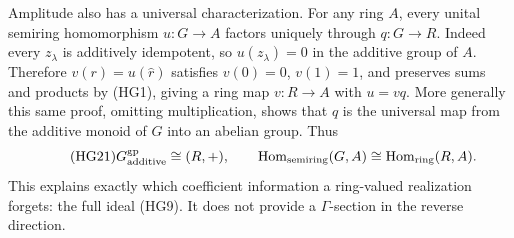 Amplitude also has a universal characterization.  For any ring
$A$, every unital semiring homomorphism $u:G\to A$ factors
uniquely through $q:G\to R$.  Indeed every $z_\lambda$ is
additively idempotent, so $u(z_\lambda)=0$ in the additive
group of $A$.  Therefore $v(r)=u(\widehat r)$ satisfies
$v(0)=0$, $v(1)=1$, and preserves sums and products by (HG1),
giving a ring map $v:R\to A$ with $u=vq$.  More generally this
same proof, omitting multiplication, shows that $q$ is the
universal map from the additive monoid of $G$ into an abelian
group.  Thus
\begin{equation}\tag{HG21}
 G^{\rm gp}_{\rm additive}\cong(R,+),\qquad
 \operatorname{Hom}_{\rm semiring}(G,A)
       \cong\operatorname{Hom}_{\rm ring}(R,A).
\end{equation}
This explains exactly which coefficient information a ring-valued
realization forgets: the full ideal (HG9).  It does not provide
a $\Gamma$-section in the reverse direction.

